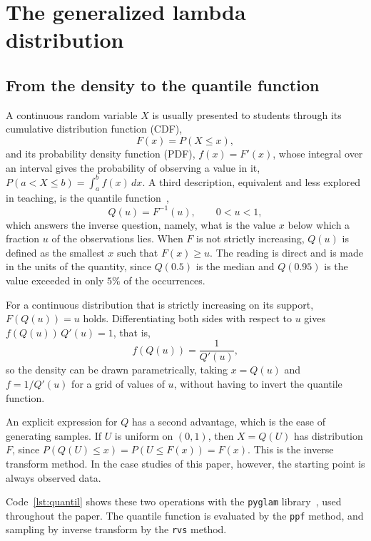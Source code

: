 \section{The generalized lambda distribution}\label{sec:gld}

\subsection{From the density to the quantile function}

A continuous random variable $X$ is usually presented to students through its cumulative distribution function (CDF),
\begin{equation}
    F(x) = P(X \leq x),
\end{equation}
and its probability density function (PDF), $f(x) = F'(x)$, whose integral over an interval gives the probability of observing a value in it, $P(a < X \leq b) = \int_a^b f(x)\,dx$. A third description, equivalent and less explored in teaching, is the quantile function~\cite{gilchrist2000},
\begin{equation}
    Q(u) = F^{-1}(u), \qquad 0 < u < 1,
    \label{eq:quantil}
\end{equation}
which answers the inverse question, namely, what is the value $x$ below which a fraction $u$ of the observations lies. When $F$ is not strictly increasing, $Q(u)$ is defined as the smallest $x$ such that $F(x) \geq u$. The reading is direct and is made in the units of the quantity, since $Q(0.5)$ is the median and $Q(0.95)$ is the value exceeded in only $5\%$ of the occurrences.

For a continuous distribution that is strictly increasing on its support, $F(Q(u)) = u$ holds. Differentiating both sides with respect to $u$ gives $f(Q(u))\,Q'(u) = 1$, that is,
\begin{equation}
    f(Q(u)) = \frac{1}{Q'(u)},
    \label{eq:densidade_quantil}
\end{equation}
so the density can be drawn parametrically, taking $x = Q(u)$ and $f = 1/Q'(u)$ for a grid of values of $u$, without having to invert the quantile function.

An explicit expression for $Q$ has a second advantage, which is the ease of generating samples. If $U$ is uniform on $(0,1)$, then $X = Q(U)$ has distribution $F$, since $P(Q(U) \leq x) = P(U \leq F(x)) = F(x)$. This is the inverse transform method. In the case studies of this paper, however, the starting point is always observed data.

Code~\ref{lst:quantil} shows these two operations with the \texttt{pyglam} library~\cite{pyglam}, used throughout the paper. The quantile function is evaluated by the \texttt{ppf} method, and sampling by inverse transform by the \texttt{rvs} method.

